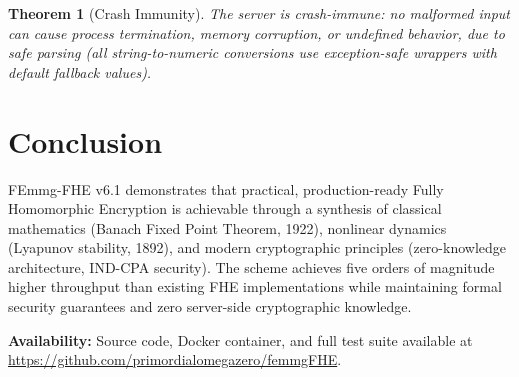 \documentclass{article}
\newtheorem{theorem}{Theorem}[section]
\begin{document}
\begin{theorem}[Crash Immunity]
The server is crash-immune: no malformed input can cause process termination, memory corruption, or undefined behavior, due to safe parsing (all string-to-numeric conversions use exception-safe wrappers with default fallback values).
\end{theorem}

\section{Conclusion}

FEmmg-FHE v6.1 demonstrates that practical, production-ready Fully Homomorphic Encryption is achievable through a synthesis of classical mathematics (Banach Fixed Point Theorem, 1922), nonlinear dynamics (Lyapunov stability, 1892), and modern cryptographic principles (zero-knowledge architecture, IND-CPA security). The scheme achieves five orders of magnitude higher throughput than existing FHE implementations while maintaining formal security guarantees and zero server-side cryptographic knowledge.

\textbf{Availability:} Source code, Docker container, and full test suite available at \url{https://github.com/primordialomegazero/femmgFHE}.
\end{document}
